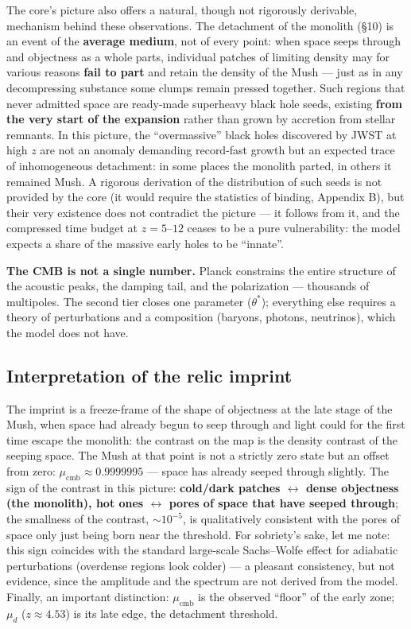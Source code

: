 \documentclass{article}
\begin{document}
The core's picture also offers a natural, though not rigorously derivable, mechanism behind these observations. The detachment of the monolith (\S10) is an event of the \textbf{average medium}, not of every point: when space seeps through and objectness as a whole parts, individual patches of limiting density may for various reasons \textbf{fail to part} and retain the density of the Mush --- just as in any decompressing substance some clumps remain pressed together. Such regions that never admitted space are ready-made superheavy black hole seeds, existing \textbf{from the very start of the expansion} rather than grown by accretion from stellar remnants. In this picture, the ``overmassive'' black holes discovered by JWST at high $z$ are not an anomaly demanding record-fast growth but an expected trace of inhomogeneous detachment: in some places the monolith parted, in others it remained Mush. A rigorous derivation of the distribution of such seeds is not provided by the core (it would require the statistics of binding, Appendix B), but their very existence does not contradict the picture --- it follows from it, and the compressed time budget at $z = 5\text{--}12$ ceases to be a pure vulnerability: the model expects a share of the massive early holes to be ``innate''.

\medskip
\noindent\textbf{The CMB is not a single number.} Planck constrains the entire structure of the acoustic peaks, the damping tail, and the polarization --- thousands of multipoles. The second tier closes one parameter ($\theta^*$); everything else requires a theory of perturbations and a composition (baryons, photons, neutrinos), which the model does not have.

\subsection{Interpretation of the relic imprint}

The imprint is a freeze-frame of the shape of objectness at the late stage of the Mush, when space had already begun to seep through and light could for the first time escape the monolith: the contrast on the map is the density contrast of the seeping space. The Mush at that point is not a strictly zero state but an offset from zero: $\mu_{\text{cmb}} \approx 0.9999995$ --- space has already seeped through slightly. The sign of the contrast in this picture: \textbf{cold/dark patches $\leftrightarrow$ dense objectness (the monolith), hot ones $\leftrightarrow$ pores of space that have seeped through}; the smallness of the contrast, ${\sim}10^{-5}$, is qualitatively consistent with the pores of space only just being born near the threshold. For sobriety's sake, let me note: this sign coincides with the standard large-scale Sachs--Wolfe effect for adiabatic perturbations (overdense regions look colder) --- a pleasant consistency, but not evidence, since the amplitude and the spectrum are not derived from the model. Finally, an important distinction: $\mu_{\text{cmb}}$ is the observed ``floor'' of the early zone; $\mu_d$ ($z \approx 4.53$) is its late edge, the detachment threshold.
\end{document}
